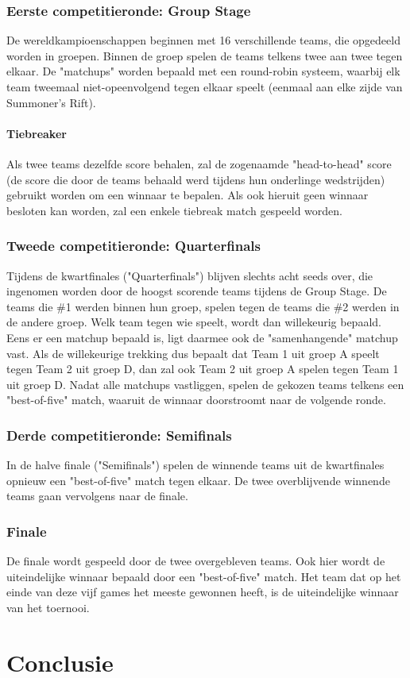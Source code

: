\documentclass[12pt,a4paper]{article}
\begin{document}
			\subsubsection{Eerste competitieronde: Group Stage}
				De wereldkampioenschappen beginnen met 16 verschillende teams, die opgedeeld worden in groepen. Binnen de groep spelen de teams telkens twee aan twee tegen elkaar. De "matchups" worden bepaald met een round-robin systeem, waarbij elk team tweemaal niet-opeenvolgend tegen elkaar speelt (eenmaal aan elke zijde van Summoner's Rift).
				\paragraph{Tiebreaker}
				Als twee teams dezelfde score behalen, zal de zogenaamde "head-to-head" score (de score die door de teams behaald werd tijdens hun onderlinge wedstrijden) gebruikt worden om een winnaar te bepalen. Als ook hieruit geen winnaar besloten kan worden, zal een enkele tiebreak match gespeeld worden.
			\subsubsection{Tweede competitieronde: Quarterfinals}
				Tijdens de kwartfinales ("Quarterfinals") blijven slechts acht seeds over, die ingenomen worden door de hoogst scorende teams tijdens de Group Stage. De teams die \#1 werden binnen hun groep, spelen tegen de teams die \#2 werden in de andere groep. Welk team tegen wie speelt, wordt dan willekeurig bepaald. Eens er een matchup bepaald is, ligt daarmee ook de "samenhangende" matchup vast. Als de willekeurige trekking dus bepaalt dat Team 1 uit groep A speelt tegen Team 2 uit groep D, dan zal ook Team 2 uit groep A spelen tegen Team 1 uit groep D. Nadat alle matchups vastliggen, spelen de gekozen teams telkens een "best-of-five" match, waaruit de winnaar doorstroomt naar de volgende ronde.
			\subsubsection{Derde competitieronde: Semifinals}
				In de halve finale ("Semifinals") spelen de winnende teams uit de kwartfinales opnieuw een "best-of-five" match tegen elkaar. De twee overblijvende winnende teams gaan vervolgens naar de finale.
			\subsubsection{Finale}
				De finale wordt gespeeld door de twee overgebleven teams. Ook hier wordt de uiteindelijke winnaar bepaald door een "best-of-five" match. Het team dat op het einde van deze vijf games het meeste gewonnen heeft, is de uiteindelijke winnaar van het toernooi.
	\section{Conclusie}
\end{document}
